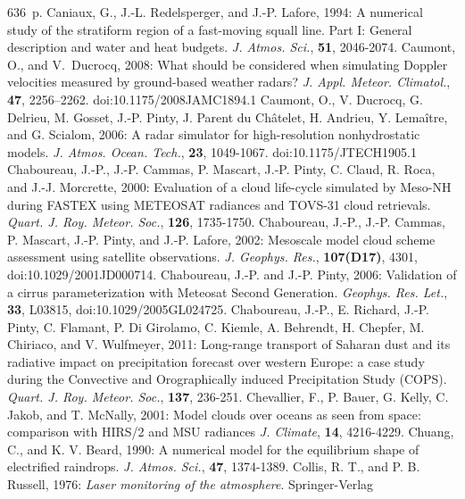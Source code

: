   636~p.
\decrefname
Caniaux, G., J.-L. Redelsperger, and J.-P. Lafore, 1994:
      A numerical study of the stratiform region of a fast-moving squall line.
      Part I: General description and water and heat budgets.
      {\it J. Atmos. Sci.},
      {\bf 51},
      2046-2074.
\decrefname
Caumont, O., and V.~Ducrocq, 2008: What should be considered when simulating
  {Doppler} velocities measured by ground-based weather radars\string? {\em J.
  Appl. Meteor. Climatol.}, {\bf 47}, 2256--2262. doi:10.1175/2008JAMC1894.1
\decrefname
Caumont, O., V. Ducrocq, G. Delrieu, M. Gosset, J.-P. Pinty, J. Parent du Ch\^atelet, 
      H. Andrieu, Y. Lema\^itre, and G. Scialom, 2006:
      A radar simulator for high-resolution nonhydrostatic models.
      {\it J. Atmos. Ocean. Tech.},
      {\bf 23},
      1049-1067. doi:10.1175/JTECH1905.1
\decrefname
Chaboureau, J.-P., J.-P. Cammas, P. Mascart, J.-P. Pinty, C. Claud, R. Roca, 
and J.-J. Morcrette, 2000: Evaluation of a cloud life-cycle simulated by
Meso-NH during FASTEX using METEOSAT radiances and TOVS-31 cloud retrievals.
      {\it Quart. J. Roy. Meteor. Soc.}, 
      {\bf 126},
      1735-1750.
\decrefname
Chaboureau, J.-P., J.-P. Cammas, P. Mascart, J.-P. Pinty, and J.-P. Lafore, 2002: Mesoscale model cloud scheme assessment using satellite observations.
      {\it J. Geophys. Res.}, 
      {\bf 107(D17)},
      4301, doi:10.1029/2001JD000714.
\decrefname
Chaboureau, J.-P. and J.-P. Pinty, 2006:
      Validation of a cirrus parameterization with Meteosat Second Generation.
      {\it Geophys. Res. Let.}, {\bf 33}, L03815, doi:10.1029/2005GL024725.
\decrefname
Chaboureau, J.-P., E. Richard, J.-P. Pinty, C. Flamant, P. Di Girolamo, C. Kiemle, A. Behrendt,
      H. Chepfer, M. Chiriaco, and V. Wulfmeyer, 2011:
      Long-range transport of Saharan dust and its radiative impact on precipitation forecast
      over western Europe: a case study during the Convective and Orographically induced
      Precipitation Study (COPS).
      {\it Quart. J. Roy. Meteor. Soc.}, 
      {\bf 137},
      236-251.
\decrefname
Chevallier, F., P. Bauer, G. Kelly, C. Jakob, and T. McNally, 2001:
      Model clouds over oceans as seen from space:
      comparison with HIRS/2 and MSU radiances
      {\it J. Climate}, 
      {\bf 14},
      4216-4229.
\decrefname
Chuang, C., and K. V. Beard, 1990:
      A numerical model for the equilibrium shape of electrified raindrops.
      {\it J. Atmos. Sci.},
      {\bf 47},
      1374-1389.
\decrefname
Collis, R. T., and P. B. Russell, 1976: \textit{Laser monitoring of the atmosphere}.
  Springer-Verlag
